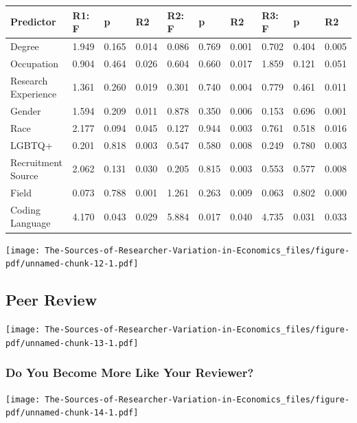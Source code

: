 \documentclass[
  letterpaper,
  DIV=11,
  numbers=noendperiod]{scrartcl}
\begin{document}
\begin{tabular}{llllllllll}
\toprule
Predictor & R1: F & p & R2 & R2: F & p & R2 & R3: F & p & R2\\
\midrule
Degree & 1.949 & 0.165 & 0.014 & 0.086 & 0.769 & 0.001 & 0.702 & 0.404 & 0.005\\
Occupation & 0.904 & 0.464 & 0.026 & 0.604 & 0.660 & 0.017 & 1.859 & 0.121 & 0.051\\
Research Experience & 1.361 & 0.260 & 0.019 & 0.301 & 0.740 & 0.004 & 0.779 & 0.461 & 0.011\\
Gender & 1.594 & 0.209 & 0.011 & 0.878 & 0.350 & 0.006 & 0.153 & 0.696 & 0.001\\
Race & 2.177 & 0.094 & 0.045 & 0.127 & 0.944 & 0.003 & 0.761 & 0.518 & 0.016\\
\addlinespace
LGBTQ+ & 0.201 & 0.818 & 0.003 & 0.547 & 0.580 & 0.008 & 0.249 & 0.780 & 0.003\\
Recruitment Source & 2.062 & 0.131 & 0.030 & 0.205 & 0.815 & 0.003 & 0.553 & 0.577 & 0.008\\
Field & 0.073 & 0.788 & 0.001 & 1.261 & 0.263 & 0.009 & 0.063 & 0.802 & 0.000\\
Coding Language & 4.170 & 0.043 & 0.029 & 5.884 & 0.017 & 0.040 & 4.735 & 0.031 & 0.033\\
\bottomrule
\end{tabular}

\texttt{[image: The-Sources-of-Researcher-Variation-in-Economics\_files/figure-pdf/unnamed-chunk-12-1.pdf]}

\hypertarget{peer-review}{%
\subsection{Peer Review}\label{peer-review}}

\texttt{[image: The-Sources-of-Researcher-Variation-in-Economics\_files/figure-pdf/unnamed-chunk-13-1.pdf]}

\hypertarget{do-you-become-more-like-your-reviewer}{%
\subsubsection{Do You Become More Like Your
Reviewer?}\label{do-you-become-more-like-your-reviewer}}

\texttt{[image: The-Sources-of-Researcher-Variation-in-Economics\_files/figure-pdf/unnamed-chunk-14-1.pdf]}
\end{document}
